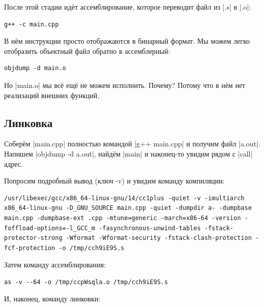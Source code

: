 \documentclass[11pt]{article}
\begin{document}
После этой стадии идёт ассемблирование, которое переводит файл из
\nolint|.s| в \nolint|.o|:

\begin{lstlisting}
g++ -c main.cpp
\end{lstlisting}

В нём инструкции просто отображаются в бинарный формат. Мы можем легко
отобразить объектный файл обратно в ассемблерный:

\begin{lstlisting}
objdump -d main.o
\end{lstlisting}

Но \nolint|main.o| мы всё ещё не можем исполнить. Почему? Потому что в нём
нет реализаций внешних функций.

\subsection{Линковка}

Соберём \nolint|main.cpp| полностью командой \nolint|g++ main.cpp| и
получим файл \nolint|a.out|. Напишем \nolint|objdump -d a.out|, найдём
\nolint|main| и наконец-то увидим рядом с \nolint|call| адрес.

Попросим подробный вывод (ключ -v) и увидим команду компиляции:

\begin{lstlisting}
/usr/libexec/gcc/x86_64-linux-gnu/14/cc1plus -quiet -v -imultiarch x86_64-linux-gnu -D_GNU_SOURCE main.cpp -quiet -dumpdir a- -dumpbase main.cpp -dumpbase-ext .cpp -mtune=generic -march=x86-64 -version -foffload-options=-l_GCC_m -fasynchronous-unwind-tables -fstack-protector-strong -Wformat -Wformat-security -fstack-clash-protection -fcf-protection -o /tmp/cch9iE9S.s
\end{lstlisting}

Затем команду ассемблирования:

\begin{lstlisting}
as -v --64 -o /tmp/ccpWsqla.o /tmp/cch9iE9S.s
\end{lstlisting}

И, наконец, команду линковки:
\end{document}
